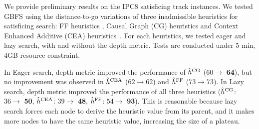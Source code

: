 We provide preliminary results on the IPC8 satisficing track
instances. We tested GBFS using the distance-to-go variations of three
\sota inadmissible heuristics for satisficing search: FF heuristics
 \cite{Hoffmann01}, Causal Graph (CG) heuristics \cite{Helmert2006} and
Context Enhanced Additive (CEA) heuristics\ \cite{helmert2008unifying}.
For each heuristics, we tested eager and lazy search, with and without
the depth metric.  Tests are conducted under 5 min, 4GB
resource constraint.

In Eager search, depth metric
improved the performance of $\hat{h}^{\text{CG}}$ ($60\rightarrow $ \textbf{64}), but no
improvement was observed in $\hat{h}^{\text{CEA}}$ ($62\rightarrow 62$)
and $\hat{h}^{\text{FF}}$ ($73\rightarrow 73$). In Lazy search, depth metric
improved the performance of all three heuristics
($\hat{h}^{\text{CG}}$: $36\rightarrow $ \textbf{50}, 
 $\hat{h}^{\text{CEA}}$: $39\rightarrow $ \textbf{48}, 
 $\hat{h}^{\text{FF}}$: $54\rightarrow $ \textbf{93}). This is reasonable
because lazy search forces each node to derive the heuristic value from
its parent, and it makes more nodes to have the same heuristic value,
increasing the size of a plateau.

%  

